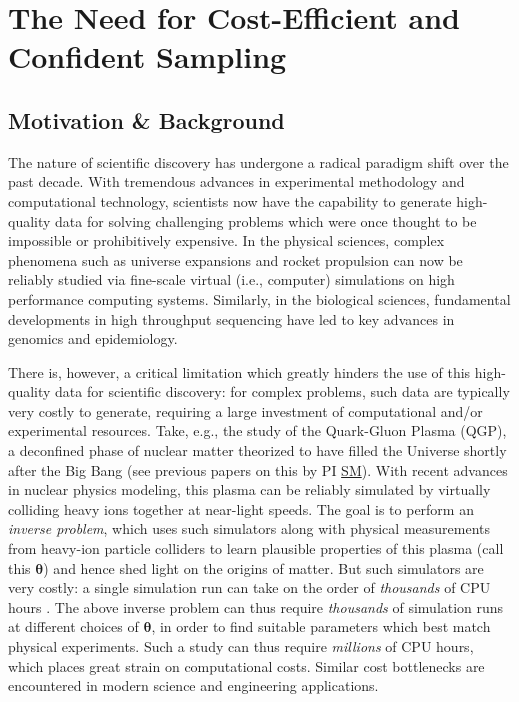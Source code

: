 \documentclass[11pt]{NSFamsart}
\newcommand{\cmtS}[1]{{\color{blue}{(Simon: #1)}}}
\newcommand{\SM}{\hyperlink{SMlink}{SM}\xspace}
\newcommand{\btheta}{{\boldsymbol{\theta}}}
\begin{document}


\section{The Need for Cost-Efficient and Confident Sampling}

\subsection{Motivation \& Background} The nature of scientific discovery has undergone a radical paradigm shift over the past decade. With tremendous advances in experimental methodology and computational technology, scientists now have the capability to generate high-quality data for solving challenging problems which were once thought to be impossible or prohibitively expensive. In the physical sciences, complex phenomena such as universe expansions \citep{kaufman2011efficient} and rocket propulsion \citep{mak2018efficient,yeh2018common} can now be reliably studied via fine-scale virtual (i.e., computer) simulations on high performance computing systems. Similarly, in the biological sciences, fundamental developments in high throughput sequencing have led to key advances in genomics and epidemiology.

There is, however, a critical limitation which greatly hinders the use of this high-quality data for scientific discovery: for complex problems, such data are typically very costly to generate, requiring a large investment of computational and/or experimental resources. Take, e.g., the study of the Quark-Gluon Plasma (QGP), a deconfined phase of nuclear matter theorized to have filled the Universe shortly after the Big Bang (see previous papers on this by PI \SM \cite{everett2021multisystem,everett2021phenomenological,liyanage2022efficient,ji2021graphical}). With recent advances in nuclear physics modeling, this plasma can be reliably simulated by virtually colliding heavy ions together at near-light speeds. The goal is to perform an \textit{inverse problem}, which uses such simulators along with physical measurements from heavy-ion particle colliders to learn plausible properties of this plasma (call this $\btheta$) and hence shed light on the origins of matter. But such simulators are very costly: a single simulation run can take on the order of \textit{thousands} of CPU hours \citep{everett2021multisystem}. The above inverse problem can thus require \textit{thousands} of simulation runs at different choices of $\btheta$, in order to find suitable parameters which best match physical experiments. Such a study can thus require \textit{millions} of CPU hours, which places great strain on computational costs. Similar cost bottlenecks are encountered in modern science and engineering applications.
\end{document}
